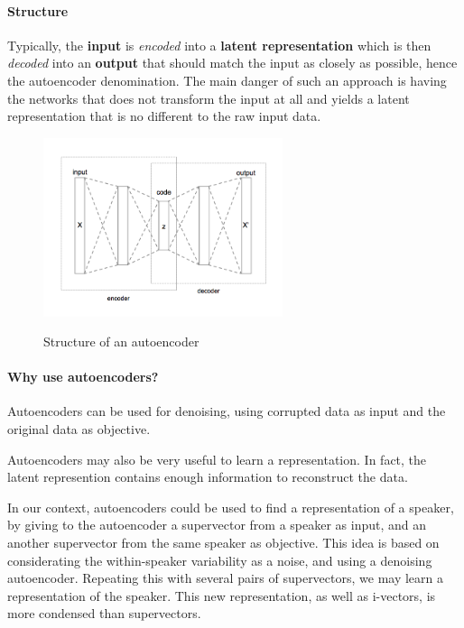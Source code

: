 \documentclass[conference]{IEEEtran}
\begin{document}
\paragraph{Structure}

Typically, the \textbf{input} is \textit{encoded} into a \textbf{latent
  representation} which is then \textit{decoded} into an \textbf{output} that
should match the input as closely as possible, hence the autoencoder
denomination. The main danger of such an approach is having the networks that
does not transform the input at all and yields a latent representation that is
no different to the raw input data. 


\begin{figure}[!h]
    \centering
    \caption{Structure of an autoencoder}
    \includegraphics[width=7cm]{Autoencoder_structure.png}
    \label{autoencoder_structure}
\end{figure}


\paragraph{Why use autoencoders?}

Autoencoders can be used for denoising, using corrupted data as input and the original data as objective.

Autoencoders may also be very useful to learn a representation. In fact, the latent represention contains enough information to reconstruct the data.

In our context, autoencoders could be used to find a representation of a speaker, by giving to the autoencoder a supervector from a speaker as input, and an another supervector from the same speaker as objective. This idea is based on considerating the within-speaker variability as a noise, and using a denoising autoencoder. Repeating this with several pairs of supervectors, we may learn a representation of the speaker. This new representation, as well as i-vectors, is more condensed than supervectors.
\end{document}
